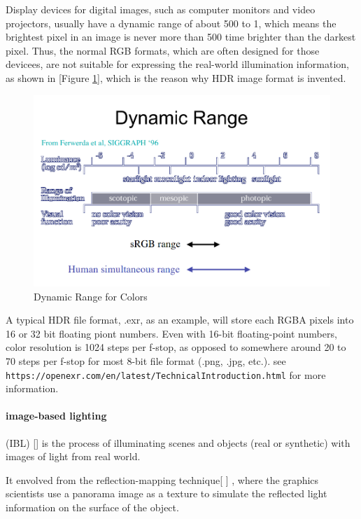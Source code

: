 \documentclass{article}
\begin{document}
Display devices for digital images, such as computer monitors and video projectors,
usually have a dynamic range of about 500 to 1, which means the brightest pixel in an image is never more than
500 time brighter than the darkest pixel.
Thus, the normal RGB formats, which are often designed for those devicees,
are not suitable for expressing the real-world illumination information,
as shown in [Figure \ref{fig:dynamic-range}],
which is the reason why HDR image format is invented.

\begin{figure}
    \centering
    \includegraphics[width=0.8\linewidth]{dynamic_range.png}
    \caption{Dynamic Range for Colors}
    \label{fig:dynamic-range}
\end{figure}


A typical HDR file format, .exr, as an example, will store each RGBA pixels into 16 or 32 bit floating piont numbers.
Even with 16-bit floating-point numbers,
color resolution is 1024 steps per f-stop,
as opposed to somewhere around 20 to 70 steps per
f-stop for most 8-bit file format (.png, .jpg, etc.). see \texttt{https://openexr.com/en/latest/TechnicalIntroduction.html} for more information.



\paragraph{image-based lighting} (IBL) [\cite{wardHighDynamicRange2008}]
is the process of illuminating scenes and objects (real or synthetic)
with images of light from real world.

It envolved from the reflection-mapping technique[
        \cite{millerIlluminationReflectionMaps1984}
        \cite{blinnTextureReflectionComputer1976}]
, where the graphics scientists use a panorama image as a texture to simulate the reflected light information
on the surface of the object.
\end{document}

